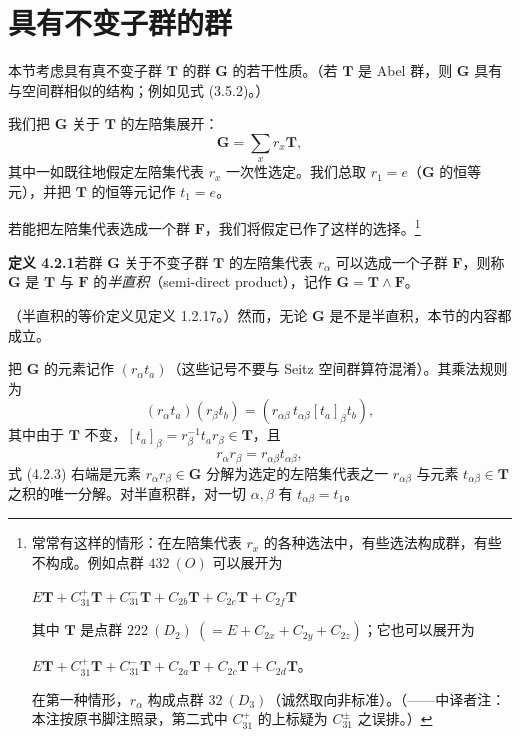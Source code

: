 \section{具有不变子群的群}

本节考虑具有真不变子群 $\mathbf{T}$ 的群 $\mathbf{G}$ 的若干性质。（若 $\mathbf{T}$ 是 Abel 群，则 $\mathbf{G}$ 具有与空间群相似的结构；例如见式 (3.5.2)。）

我们把 $\mathbf{G}$ 关于 $\mathbf{T}$ 的左陪集展开：
\begin{equation*}
\mathbf{G} = \sum_{x}r_{x}\mathbf{T},
\tag{4.2.1}
\end{equation*}
其中一如既往地假定左陪集代表 $r_{x}$ 一次性选定。我们总取 $r_{1} = e$（$\mathbf{G}$ 的恒等元），并把 $\mathbf{T}$ 的恒等元记作 $t_{1} = e$。

若能把左陪集代表选成一个群 $\mathbf{F}$，我们将假定已作了这样的选择。\footnote{常常有这样的情形：在左陪集代表 $r_{x}$ 的各种选法中，有些选法构成群，有些不构成。例如点群 $432\ (O)$ 可以展开为
\begin{center}
$E\mathbf{T} + C^{+}_{31}\mathbf{T} + C^{-}_{31}\mathbf{T} + C_{2b}\mathbf{T} + C_{2e}\mathbf{T} + C_{2f}\mathbf{T}$
\end{center}
其中 $\mathbf{T}$ 是点群 $222\ (D_{2})\ (= E + C_{2x} + C_{2y} + C_{2z})$；它也可以展开为
\begin{center}
$E\mathbf{T} + C^{+}_{31}\mathbf{T} + C^{-}_{31}\mathbf{T} + C_{2a}\mathbf{T} + C_{2c}\mathbf{T} + C_{2d}\mathbf{T}$。
\end{center}
在第一种情形，$r_{\alpha}$ 构成点群 $32\ (D_{3})$（诚然取向非标准）。（——中译者注：本注按原书脚注照录，第二式中 $C^{+}_{31}$ 的上标疑为 $C^{\pm}_{31}$ 之误排。）}

\noindent\textbf{定义 4.2.1}\quad 若群 $\mathbf{G}$ 关于不变子群 $\mathbf{T}$ 的左陪集代表 $r_{\alpha}$ 可以选成一个子群 $\mathbf{F}$，则称 $\mathbf{G}$ 是 $\mathbf{T}$ 与 $\mathbf{F}$ 的\textit{半直积}（semi-direct product），记作 $\mathbf{G} = \mathbf{T} \wedge \mathbf{F}$。

（半直积的等价定义见定义 1.2.17。）然而，无论 $\mathbf{G}$ 是不是半直积，本节的内容都成立。

把 $\mathbf{G}$ 的元素记作 $(r_{\alpha}t_{a})$（这些记号不要与 Seitz 空间群算符混淆）。其乘法规则为
\begin{equation*}
(r_{\alpha}t_{a})(r_{\beta}t_{b}) = (r_{\alpha\beta}\, t_{\alpha\beta}[t_{a}]_{\beta}t_{b}),
\tag{4.2.2}
\end{equation*}
其中由于 $\mathbf{T}$ 不变，$[t_{a}]_{\beta} = r^{-1}_{\beta}t_{a}r_{\beta} \in \mathbf{T}$，且
\begin{equation*}
r_{\alpha}r_{\beta} = r_{\alpha\beta}t_{\alpha\beta},
\tag{4.2.3}
\end{equation*}
式 (4.2.3) 右端是元素 $r_{\alpha}r_{\beta} \in \mathbf{G}$ 分解为选定的左陪集代表之一 $r_{\alpha\beta}$ 与元素 $t_{\alpha\beta} \in \mathbf{T}$ 之积的唯一分解。对半直积群，对一切 $\alpha, \beta$ 有 $t_{\alpha\beta} = t_{1}$。

